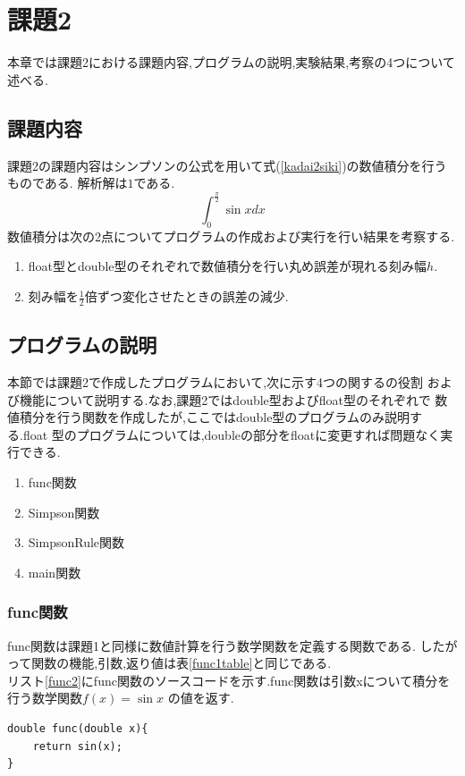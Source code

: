 \documentclass[dvipdfmx]{jarticle}
\begin{document}
    \section{課題2}
    本章では課題2における課題内容,プログラムの説明,実験結果,考察の4つについて述べる.
    \subsection{課題内容}
    課題2の課題内容はシンプソンの公式を用いて式(\ref{kadai2siki})の数値積分を行うものである.
    解析解は$1$である.
    \begin{equation}
      \int_0^\frac{\pi}{2} \sin x dx
          \label{kadai2siki}
        \end{equation}
    数値積分は次の2点についてプログラムの作成および実行を行い結果を考察する.
    \begin{enumerate}
      \item float型とdouble型のそれぞれで数値積分を行い丸め誤差が現れる刻み幅$h$.
      \item 刻み幅を$\frac{1}{2}$倍ずつ変化させたときの誤差の減少.
      \end{enumerate}

    \subsection{プログラムの説明}
    本節では課題2で作成したプログラムにおいて,次に示す4つの関するの役割
    および機能について説明する.なお,課題2ではdouble型およびfloat型のそれぞれで
    数値積分を行う関数を作成したが,ここではdouble型のプログラムのみ説明する.float
    型のプログラムについては,doubleの部分をfloatに変更すれば問題なく実行できる.
    \begin{enumerate}
      \item func関数
      \item Simpson関数
      \item SimpsonRule関数
      \item main関数
      \end{enumerate}
    
    \subsubsection{func関数}
    func関数は課題1と同様に数値計算を行う数学関数を定義する関数である.
    したがって関数の機能,引数,返り値は表\ref{func1table}と同じである.\\
      リスト\ref{func2}にfunc関数のソースコードを示す.func関数は引数xについて積分を行う数学関数$f(x)=\sin x$
      の値を返す.
      \begin{lstlisting}[basicstyle=\ttfamily\footnotesize, frame=single,label=func2,caption=func関数]
double func(double x){
    return sin(x);
} 
            \end{lstlisting}
\end{document}
